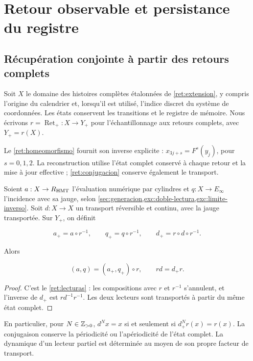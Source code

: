 \section{Retour observable et persistance du registre}
\label{nuclear:9}
\subsection{Récupération conjointe à partir des retours complets}

Soit \(X\) le domaine des histoires complètes étalonnées de
\cref{ret:extension}, y compris l’origine du calendrier et, lorsqu’il est
utilisé, l’indice discret du système de coordonnées. Les états conservent les
transitions et le registre de mémoire. Nous écrivons
\(r=\operatorname{Ret}_+:X\to Y_+\) pour l’échantillonnage aux retours
complets, avec \(Y_+=r(X)\).

Le \cref{ret:homeomorfismo} fournit son inverse explicite :
\(x_{3j+s}=F^s(y_j)\), pour \(s=0,1,2\). La reconstruction utilise
l’état complet conservé à chaque retour et la mise à jour
effective ; \eqref{ret:conjugacion} conserve également le transport.

Soient \(a:X\to R_{\rm HMT}\) l’évaluation numérique par cylindres et
\(q:X\to E_\infty\) l’incidence avec sa jauge, selon
\cref{sec:generacion,exc:doble-lectura,exc:limite-inverso}.
Soit \(d:X\to X\) un transport réversible et continu, avec la jauge
transportée. Sur \(Y_+\), on définit




\[
a_+=a\circ r^{-1},\qquad q_+=q\circ r^{-1},\qquad d_+=r\circ d\circ r^{-1}.
\]



Alors



\begin{equation}
\boxed{(a,q)=(a_+,q_+)\circ r,\qquad rd=d_+r.}
\label{nuc09:lecturas}
\end{equation}



\begin{proof}
C’est le \cref{ret:lecturas} : les compositions avec \(r\)
et \(r^{-1}\) s’annulent, et l’inverse de \(d_+\) est \(rd^{-1}r^{-1}\).
Les deux lecteurs sont transportés à partir du même état complet.
\end{proof}

En particulier, pour \(N\in\mathbb Z_{>0}\),
\(d^Nx=x\) si et seulement si \(d_+^Nr(x)=r(x)\).
La conjugaison conserve la périodicité ou l’apériodicité de l’état
complet. La dynamique d’un lecteur partiel est déterminée au moyen
de son propre facteur de transport.


